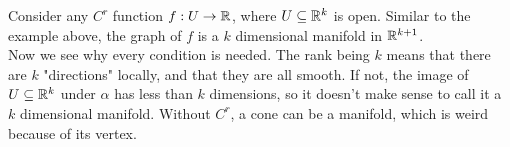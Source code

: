 \documentclass[12pt]{article}
\begin{document}
Consider any $C^r$ function $f: U \rightarrow \mathbb{R}$, where $U \subseteq \mathbb{R}^k$ is open. Similar to the example above, the graph of $f$ is a $k$ dimensional manifold in $\mathbb{R}^{k+1}$. \\

Now we see why every condition is needed. The rank being $k$ means that there are $k$ "directions" locally, and that they are all smooth. If not, the image of $U \subseteq \mathbb{R}^k$ under $\alpha$ has less than $k$ dimensions, so it doesn't make sense to call it a $k$ dimensional manifold. Without $C^r$, a cone can be a manifold, which is weird because of its vertex.
\end{document}
